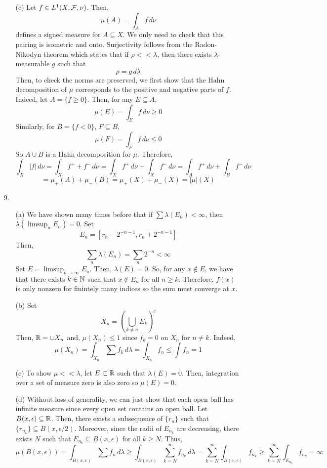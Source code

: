 \begin{itemize}
\begin{itemize}
\item[(c)] Let $f \in L^1(X, \mathcal{F},\nu)$. Then,
	\[ \mu(A) = \int_A f \,d \nu \]
defines a signed measure for $A \subseteq X$. We only need to check that this pairing is isometric and onto. Surjectivity follows from the Radon-Nikodyn theorem which states that if $\rho << \lambda$, then there exists $\lambda$-measurable $g$ such that
	\[ \rho = g \, d \lambda \]
Then, to check the norms are preserved, we first show that the Hahn decomposition of $\mu$ corresponds to the positive and negative parts of $f$. Indeed, let $A = \{ f \ge 0\}$. Then, for any $E \subseteq A$,
	\[ \mu(E) = \int_E f \, d \nu \ge 0 \]
Similarly, for $B = \{f < 0\}$, $F \subseteq B$,
	\[ \mu(F) = \int_F f \, d \nu \le 0 \]
So $A \cup B$ is a Hahn decomposition for $\mu$. Therefore,
	\[ \int_X |f| \, d \nu = \int_X f^+ + f^- \, d\nu = \int_X f^+ \, d\nu+ \int_X f^- \, d\nu = \int_A f^+ \, d\nu+ \int_B f^- \, d\nu \] \[= \mu_+(A) + \mu_-(B) = \mu_+(X) + \mu_-(X) = |\mu|(X) \]
\end{itemize}


\item[9.] 
\begin{itemize}\label{q:s13-9}\mbox{~}
\item[(a)]
We have shown many times before that if $\sum \lambda(E_n) < \infty$, then $\lambda (\limsup_{n} E_n) =0$. Set 
	\[ E_n = [r_n-2^{-n-1},r_n+2^{-n-1}] \]
	Then,
	\[ \sum_n \lambda(E_n) = \sum_n 2^{-n} < \infty \]
	Set $E = \limsup_{n \to \infty} E_n$. Then, $\lambda(E)=0$. So, for any $x \not\in E$, we have that there exists $k \in \mathbb{N}$ such that $x \not\in E_n$ for all $n \ge k$. Therefore, $f(x)$ is only nonzero for finintely many indices so the sum must converge at $x$.
\item[(b)] Set 
		\[ X_n = \left( \bigcup_{k \ne n} E_k\right)^c \]
	Then, $\mathbb{R} = \cup X_n$ and, $\mu(X_n)\le 1$ since $f_k = 0$ on $X_n$ for $n \ne k$. Indeed,
		\[ \mu(X_n) = \int_{X_n} \sum f_k \, d\lambda = \int_{X_n} f_n \le \int f_n = 1 \]
\item[(c)] To show $\mu << \lambda$, let $E \subset \mathbb{R}$ such that $\lambda(E)=0$. Then, integration over a set of measure zero is also zero so $\mu(E)=0$.
\item[(d)] Without loss of generality, we can just show that each open ball has infinite measure since every open set contains an open ball. Let $B(x,\epsilon) \subseteq \mathbb{R}$. Then, there exists a subsequence of $\{r_n\}$ such that $\{r_{n_k}\} \subseteq B(x,\epsilon/2)$. Moreover, since the radii of $E_{n_k}$ are decreasing, there exists $N$ such that $E_{n_k} \subseteq B(x,\epsilon)$ for all $k \ge N$. Thus,
		\[ \mu(B(x,\epsilon)) = \int_{B(x,\epsilon)} \sum f_n \, d\lambda \ge \int_{B(x,\epsilon)} \sum_{k=N}^\infty f_{n_k} \, d\lambda = \sum_{k=N}^\infty \int_{B(x,\epsilon)} f_{n_k} \ge \sum_{k=N}^\infty \int_{E_{n_k}} f_{n_k} = \infty \]
\end{itemize}


\end{itemize}
